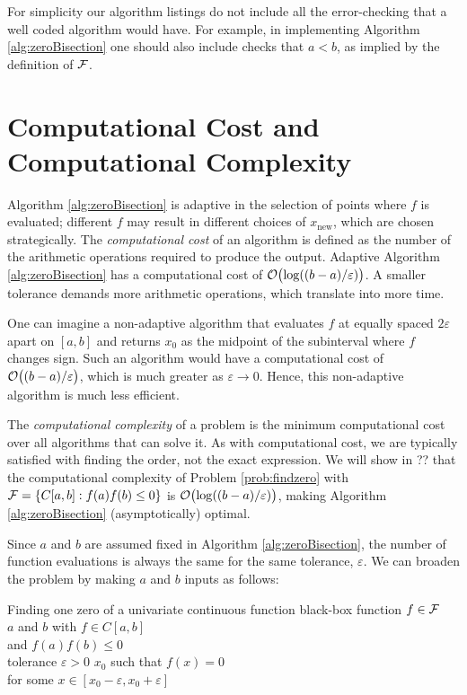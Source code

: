 For simplicity our algorithm listings do not include all the error-checking that a well coded algorithm would have.  For example, in implementing Algorithm \ref{alg:zeroBisection} one should also include checks that $a< b$, as implied by the definition of $\mathcal{F}$.

\section{Computational Cost and Computational Complexity}

Algorithm \ref{alg:zeroBisection} is adaptive in the selection of points where $f$ is evaluated; different $f$ may result in different choices of $x_{\text{new}}$, which are chosen strategically. The \emph{computational cost} of an algorithm is defined as the number of the arithmetic operations required to produce the output.  Adaptive Algorithm \ref{alg:zeroBisection} has a computational cost of $\operatorname{{\mathcal O}}\bigl(\log((b-a)/\varepsilon)\bigr)$.  A smaller tolerance demands more arithmetic operations, which translate into more time.

One can imagine a non-adaptive algorithm that evaluates $f$ at  equally spaced $2\varepsilon$ apart on $[a,b]$ and returns $x_0$ as the midpoint of the subinterval where $f$ changes sign.  Such an algorithm would have a computational cost of $\operatorname{{\mathcal O}}\bigl((b-a)/\varepsilon\bigr)$, which is much greater as $\varepsilon \to 0$.  Hence, this non-adaptive algorithm is much less efficient.   

The \emph{computational complexity} of a problem is the minimum computational cost over all algorithms that can solve it.  As with computational cost, we are typically satisfied with finding the order, not the exact expression.  We will show in ?? that the computational complexity of Problem \ref{prob:findzero} with $\mathcal{F} = \{C[a,b] : f(a)f(b) \le 0\}$ is $\operatorname{{\mathcal O}}\bigl(\log((b-a)/\varepsilon)\bigr)$, making Algorithm \ref{alg:zeroBisection} (asymptotically) optimal.

Since $a$ and $b$ are assumed fixed in Algorithm \ref{alg:zeroBisection}, the number of function evaluations is always the same for the same tolerance, $\varepsilon$.  We can broaden the problem by making $a$ and $b$ inputs as follows:

\begin{problem}{Finding one zero of a univariate continuous function}%
\label{prob:findzerocont}
%
{black-box function $f \in \mathcal{F}$ \\ 
$a$ and $b$ with $f \in C[a,b]$ \\
\qquad and $f(a) f(b) \le 0$ \\
tolerance $\varepsilon > 0$ }%
{$x_0$ such that $f(x) = 0$ \\ 
    \qquad for some $x \in [x_0 - \varepsilon, x_0 + \varepsilon]$}
\end{problem}

